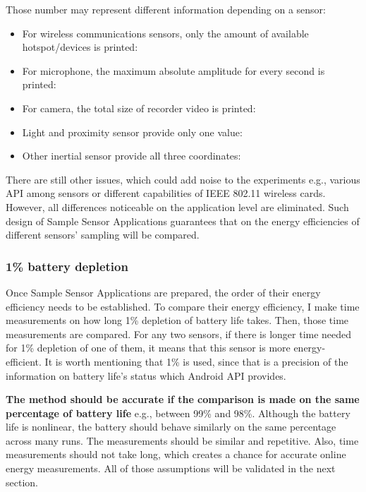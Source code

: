 Those number may represent different information depending on a sensor:
\begin{itemize}
	\item For wireless communications sensors, only the amount of available hotspot/devices is printed: 
	\item For microphone, the maximum absolute amplitude for every second is printed:
	\item For camera, the total size of recorder video is printed:
	\item Light and proximity sensor provide only one value:
	\item Other inertial sensor provide all three coordinates:
\end{itemize}

There are still other issues, which could add noise to the experiments e.g., various API among sensors or different capabilities of IEEE 802.11 wireless cards. However, all differences noticeable on the application level are eliminated. Such design of Sample Sensor Applications guarantees that on the energy efficiencies of different sensors' sampling will be compared. 
				
\subsubsection{1\% battery depletion}	
\label{s:design:measurements:method}
\hspace{10pt} Once  Sample Sensor Applications are prepared, the order of their energy efficiency needs to be established. To compare their energy efficiency, I make time measurements on how long 1\% depletion of battery life takes. Then, those time measurements are compared. For any two sensors, if there is longer time needed for 1\% depletion of one of them, it means that this sensor is more energy-efficient. It is worth mentioning that 1\% is used, since that is a precision of the information on battery life's status which Android API provides.

\textbf{The method should be accurate if the comparison is made on the same percentage of battery life} e.g., between 99\% and 98\%. Although the battery life is nonlinear, the battery should behave similarly on the same percentage across many runs. The measurements should be similar and repetitive. Also, time measurements should not take long, which creates a chance for accurate online energy measurements. All of those assumptions will be validated in the next section.

